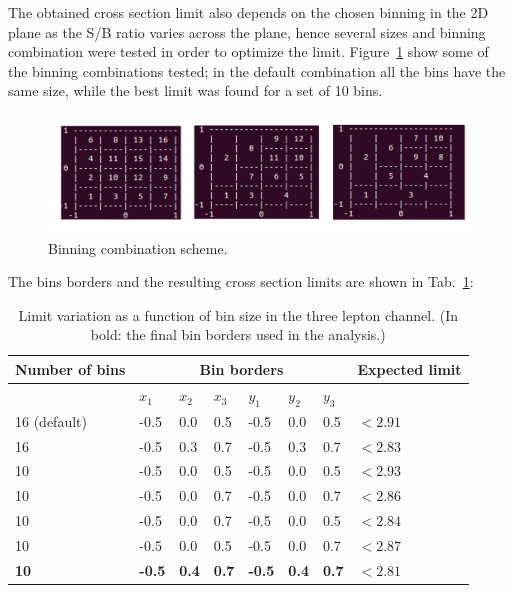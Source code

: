 The obtained cross section limit also depends on the chosen binning in the 2D plane as the S/B ratio varies across the plane, hence several sizes and binning combination were tested in order to optimize the limit.
Figure~\ref{bins} show some of the binning combinations tested; in the default combination all the bins have the same size, while the best limit was found for a set of 10 bins.

\begin{figure} [!h]
 \centering
 \includegraphics[width=\textwidth]{figures/bin_scheme.pdf} 
\caption{Binning combination scheme.}
\label{bins}
\end{figure}

The bins borders and the resulting cross section limits are shown in Tab.~\ref{bin_limits}:

\begin{table}[h!]
\centering
\begin{tabular}{llllllll}
Number of bins  & \multicolumn{6}{c}{Bin borders}  & Expected limit \\\hline 
                &$x_1$&$x_2$&$x_3$&$y_1$&$y_2$&$y_3$&\\\hline           
16 (default)    &-0.5 & 0.0 & 0.5 &-0.5 & 0.0 & 0.5 & $<2.91$\\
16              &-0.5 & 0.3 & 0.7 &-0.5 & 0.3 & 0.7 & $<2.83$\\
10              &-0.5 & 0.0 & 0.5 &-0.5 & 0.0 & 0.5 & $<2.93$\\
10              &-0.5 & 0.0 & 0.7 &-0.5 & 0.0 & 0.7 & $<2.86$\\
10              &-0.5 & 0.0 & 0.7 &-0.5 & 0.0 & 0.5 & $<2.84$\\
10              &-0.5 & 0.0 & 0.5 &-0.5 & 0.0 & 0.7 & $<2.87$\\
\textbf{10}     &\textbf{-0.5} &\textbf{ 0.4} &\textbf{ 0.7} &\textbf{-0.5} &\textbf{ 0.4} &\textbf{ 0.7} &$\mathbf{<2.81}$\\\hline
\end{tabular}
\caption{Limit variation as a function of bin size in the three lepton channel. (In bold: the final bin borders used in the analysis.)}
\label{bin_limits}
\end{table}



